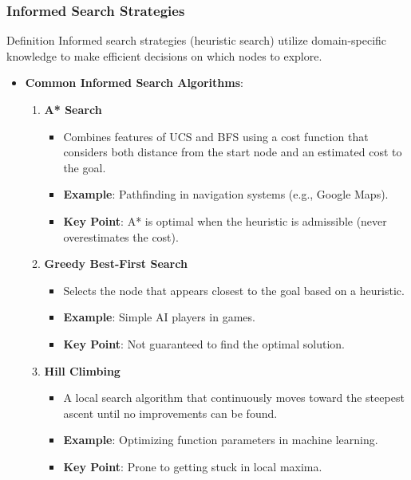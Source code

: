 \documentclass[aspectratio=169]{beamer}
\begin{document}
\begin{frame}[fragile]
  \frametitle{Informed Search Strategies}
  \begin{block}{Definition}
    Informed search strategies (heuristic search) utilize domain-specific knowledge to make efficient decisions on which nodes to explore.
  \end{block}
  \begin{itemize}
    \item \textbf{Common Informed Search Algorithms}:
    \begin{enumerate}
      \item \textbf{A* Search}
      \begin{itemize}
        \item Combines features of UCS and BFS using a cost function that considers both distance from the start node and an estimated cost to the goal.
        \item \textbf{Example}: Pathfinding in navigation systems (e.g., Google Maps).
        \item \textbf{Key Point}: A* is optimal when the heuristic is admissible (never overestimates the cost).
      \end{itemize}

      \item \textbf{Greedy Best-First Search}
      \begin{itemize}
        \item Selects the node that appears closest to the goal based on a heuristic.
        \item \textbf{Example}: Simple AI players in games.
        \item \textbf{Key Point}: Not guaranteed to find the optimal solution.
      \end{itemize}

      \item \textbf{Hill Climbing}
      \begin{itemize}
        \item A local search algorithm that continuously moves toward the steepest ascent until no improvements can be found.
        \item \textbf{Example}: Optimizing function parameters in machine learning.
        \item \textbf{Key Point}: Prone to getting stuck in local maxima.
      \end{itemize}
    \end{enumerate}
  \end{itemize}
\end{frame}
\end{document}
